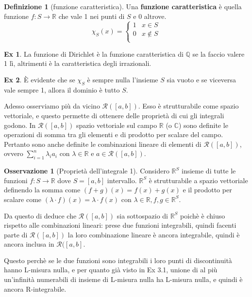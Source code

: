 \documentclass{article}
\theoremstyle{definition}
\theoremstyle{definition}
\theoremstyle{definition}
\newtheorem{definition}{Definizione}[section]
\theoremstyle{definition}
\newtheorem{remark}{Osservazione}[section]
\theoremstyle{definition}
\newtheorem{example}{Ex}[section]
\begin{document}
\begin{definition}[funzione caratteristica]
    Una \textbf{funzione caratteristica} è quella funzione $f:S\rightarrow \mathbb{R}$ che vale 1 nei punti di $S$ e 0 altrove.
    \[
        \chi_S(x) = \begin{cases}
            1 & x\in S \\
            0 & x \notin S \\
        \end{cases}
    \]
\end{definition}

\begin{example}
    La funzione di Dirichlet è la funzione caratteristica di $\mathbb{Q}$ se la faccio valere 1 lì, altrimenti è la caratteristica degli irrazionali.
\end{example}

\begin{example}
    È evidente che se $\chi_S$ è sempre nulla l'insieme $S$ sia vuoto e se viceversa vale sempre 1, allora il dominio è tutto $S$.
\end{example}

Adesso osserviamo più da vicino $\mathcal{R}([a,b])$. Esso è strutturabile come spazio vettoriale, e questo permette di ottenere delle proprietà di cui gli integrali godono. In $\mathcal{R}([a,b])$ spazio vettoriale sul campo $\mathbb{R}$ (o $\mathbb{C}$) sono definite le operazioni di somma tra gli elementi e di prodotto per scalare del campo. Pertanto sono anche definite le combinazioni lineare di elementi di $\mathcal{R}([a,b])$, ovvero $\displaystyle\sum_{i=1}^{n}\lambda_ia_i$ con $\lambda \in \mathbb{R}$ e $a\in \mathcal{R}([a,b])$.

\vspace{3mm}

\begin{remark}[Proprietà dell'integrale 1]
    Considero $\mathbb{R}^S$ insieme di tutte le funzioni $f:S\rightarrow \mathbb{R}$ dove $S=[a,b]$ intervallo. $\mathbb{R}^S$ è strutturabile a spazio vettoriale definendo la somma come $(f+g)(x)=f(x)+g(x)$ e il prodotto per scalare come $(\lambda\cdot f)(x)=\lambda \cdot f(x)$ con $\lambda\in\mathbb{R}, f,g\in\mathbb{R}^S$.

    Da questo di deduce che $\mathcal{R}([a,b])$ sia sottospazio di $\mathbb{R}^S$ poichè è chiuso rispetto alle combinazioni lineari: prese due funzioni integrabili, quindi facenti parte di $\mathcal{R}([a,b])$ la loro combinazione lineare è ancora integrabile, quindi è ancora inclusa in $\mathcal{R}([a,b]$.

    Questo perchè se le due funzioni sono integrabili i loro punti di discontinuità hanno L-misura nulla, e per quanto già visto in Ex 3.1, unione di al più un'infinità numerabili di insieme di L-misura nulla ha L-misura nulla, e quindi è ancora R-integrabile.
\end{remark}
\end{document}
